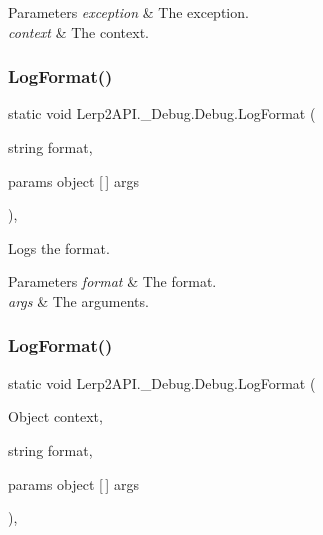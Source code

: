 \begin{DoxyParams}{Parameters}
{\em exception} & The exception.\\
\hline
{\em context} & The context.\\
\hline
\end{DoxyParams}
\mbox{\label{class_lerp2_a_p_i_1_1___debug_1_1_debug_a5ef6b80ff6d814a3425593a33185e73e}} 
\subsubsection{\texorpdfstring{Log\+Format()}{LogFormat()}\hspace{0.1cm}{\footnotesize\ttfamily [1/2]}}
{\footnotesize\ttfamily static void Lerp2\+A\+P\+I.\+\_\+\+Debug.\+Debug.\+Log\+Format (\begin{DoxyParamCaption}\item[{string}]{format,  }\item[{params object \mbox{[}$\,$\mbox{]}}]{args }\end{DoxyParamCaption})\hspace{0.3cm}{\ttfamily [inline]}, {\ttfamily [static]}}



Logs the format. 


\begin{DoxyParams}{Parameters}
{\em format} & The format.\\
\hline
{\em args} & The arguments.\\
\hline
\end{DoxyParams}
\mbox{\label{class_lerp2_a_p_i_1_1___debug_1_1_debug_a43c56409acbbb39952c543110295f370}} 
\subsubsection{\texorpdfstring{Log\+Format()}{LogFormat()}\hspace{0.1cm}{\footnotesize\ttfamily [2/2]}}
{\footnotesize\ttfamily static void Lerp2\+A\+P\+I.\+\_\+\+Debug.\+Debug.\+Log\+Format (\begin{DoxyParamCaption}\item[{Object}]{context,  }\item[{string}]{format,  }\item[{params object \mbox{[}$\,$\mbox{]}}]{args }\end{DoxyParamCaption})\hspace{0.3cm}{\ttfamily [inline]}, {\ttfamily [static]}}



